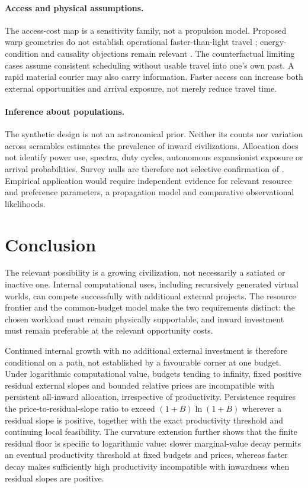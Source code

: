 \paragraph{Access and physical assumptions.}
The access-cost map is a sensitivity family, not a propulsion model.
Proposed warp geometries do not establish operational faster-than-light
travel \citep{Alcubierre1994}; energy-condition and causality objections
remain relevant \citep{Everett1996,Santiago2022}. The counterfactual
limiting cases assume consistent scheduling without usable travel into
one's own past. A rapid material courier may also carry information.
Faster access can increase both external opportunities and arrival
exposure, not merely reduce travel time.

\paragraph{Inference about populations.}
The synthetic design is not an astronomical prior. Neither its counts nor
variation across scrambles estimates the prevalence of inward civilizations.
Allocation does not identify power use, spectra, duty cycles, autonomous
expansionist exposure or arrival probabilities. Survey nulls are therefore
not selective confirmation of \CITH. Empirical application would require
independent evidence for relevant resource and preference parameters,
a propagation model and comparative observational likelihoods.

\section{Conclusion}
The relevant possibility is a growing civilization, not necessarily a
satiated or inactive one. Internal computational uses, including recursively
generated virtual worlds, can compete successfully with additional external
projects. The resource frontier and the common-budget model make the two
requirements distinct: the chosen workload must remain physically
supportable, and inward investment must remain preferable at the relevant
opportunity costs.

Continued internal growth with no additional external investment is
therefore conditional on a path, not established by a favourable corner
at one budget. Under logarithmic computational value, budgets tending to
infinity, fixed positive residual external slopes and bounded relative
prices are incompatible with persistent all-inward allocation, irrespective
of productivity. Persistence requires the price-to-residual-slope ratio to
exceed $(1+B)\ln(1+B)$ wherever a residual slope is positive, together
with the exact productivity threshold and continuing local feasibility.
The curvature extension further shows that the finite residual floor is
specific to logarithmic value: slower marginal-value decay permits an
eventual productivity threshold at fixed budgets and prices, whereas
faster decay makes sufficiently high productivity incompatible with
inwardness when residual slopes are positive.

